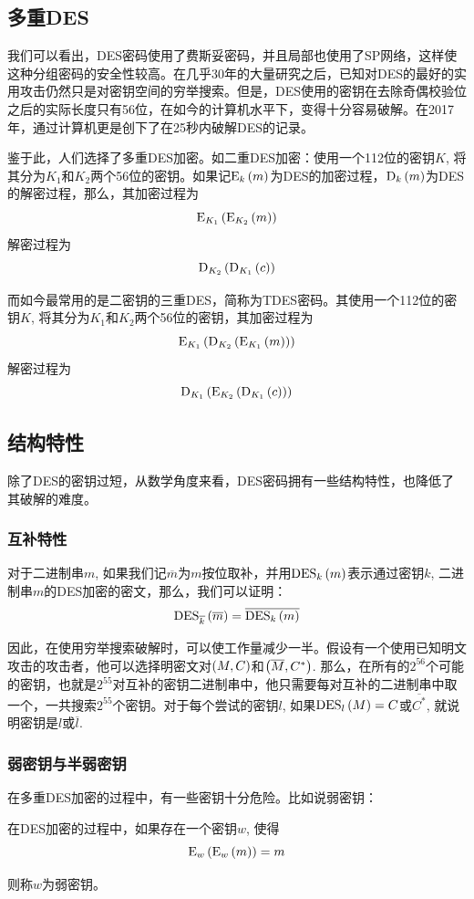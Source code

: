 \subsection{多重DES}
我们可以看出，DES密码使用了费斯妥密码，并且局部也使用了SP网络，这样使这种分组密码的安全性较高。在几乎30年的大量研究之后，已知对DES的最好的实用攻击仍然只是对密钥空间的穷举搜索。但是，DES使用的密钥在去除奇偶校验位之后的实际长度只有56位，在如今的计算机水平下，变得十分容易破解。在2017年，通过计算机更是创下了在25秒内破解DES的记录。\par
鉴于此，人们选择了多重DES加密。如二重DES加密：使用一个112位的密钥$K$, 将其分为$K_1$和$K_2$两个56位的密钥。如果记$\mathrm{E}_k\left( {m}\right)$为DES的加密过程，$\mathrm{D}_k\left( {m}\right)$为DES的解密过程，那么，其加密过程为
\[\mathrm{E}_{K_1}\left( {\mathrm{E}_{K_2}\left( {m}\right)}\right)\]
解密过程为
\[\mathrm{D}_{K_2}\left( {\mathrm{D}_{K_1}\left( {c}\right)}\right)\]

而如今最常用的是二密钥的三重DES，简称为TDES密码。其使用一个112位的密钥$K$, 将其分为$K_1$和$K_2$两个56位的密钥，其加密过程为
\[\mathrm{E}_{K_1}\left( {\mathrm{D}_{K_2}\left( {\mathrm{E}_{K_1}\left( {m}\right)}\right)}\right)\]
解密过程为
\[\mathrm{D}_{K_1}\left( {\mathrm{E}_{K_2}\left( {\mathrm{D}_{K_1}\left( {c}\right)}\right)}\right)\]
\subsection{结构特性}
除了DES的密钥过短，从数学角度来看，DES密码拥有一些结构特性，也降低了其破解的难度。
\subsubsection{互补特性}
对于二进制串$m$, 如果我们记$\overline{m}$为$m$按位取补，并用$\mathrm{DES}_k\left( {m}\right)$表示通过密钥$k$, 二进制串$m$的DES加密的密文，那么，我们可以证明：
\begin{equation}
\mathrm{DES}_{\overline{k}}\left( {\overline{m}}\right)=\overline{\mathrm{DES}_k\left( {m}\right)}
\end{equation}

因此，在使用穷举搜索破解时，可以使工作量减少一半。假设有一个使用已知明文攻击的攻击者，他可以选择明密文对$\left( {M, C}\right)$和$\left( {\overline{M}, C^*}\right)$. 那么，在所有的$2^{56}$个可能的密钥，也就是$2^{55}$对互补的密钥二进制串中，他只需要每对互补的二进制串中取一个，一共搜索$2^{55}$个密钥。对于每个尝试的密钥$l$, 如果$\mathrm{DES}_{l}\left( {M}\right)=C$或$\overline{C^*}$, 就说明密钥是$l$或$\overline{l}$.
\subsubsection{弱密钥与半弱密钥}
在多重DES加密的过程中，有一些密钥十分危险。比如说弱密钥：
\begin{Definition}
在DES加密的过程中，如果存在一个密钥$w$, 使得
\begin{equation}\label{weakKey}
\mathrm{E}_w\left( {\mathrm{E}_w\left( {m}\right)}\right)=m
\end{equation}

则称$w$为弱密钥。
\end{Definition}

